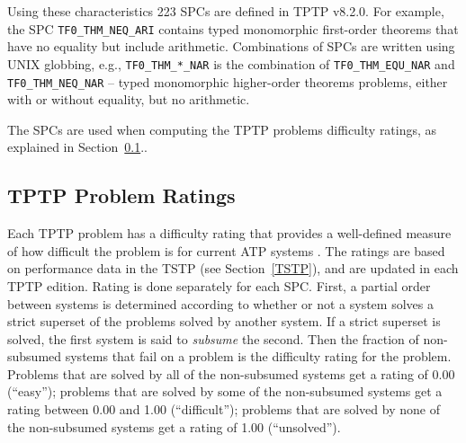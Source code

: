 \documentclass[runningheads]{llncs}
\begin{document}
Using these characteristics 223 SPCs are defined in TPTP v8.2.0. 
For example, the SPC
{\tt TF0\_THM\_NEQ\_ARI} contains typed monomorphic first-order theorems that have no equality but 
include arithmetic.
Combinations of SPCs are written using UNIX globbing, e.g., {\tt TF0\_THM\_*\_NAR} is the
combination of {\tt TF0\_THM\_EQU\_NAR} and {\tt TF0\_THM\_NEQ\_NAR} -- typed monomorphic 
higher-order theorems problems, either with or without equality, but no arithmetic.

The SPCs are used when computing the TPTP problems difficulty ratings, as explained in
Section~\ref{Ratings}..

\subsection{TPTP Problem Ratings}
\label{Ratings}

Each TPTP problem has a difficulty rating that provides a well-defined measure of how difficult 
the problem is for current ATP systems \cite{SS01}.
The ratings are based on performance data in the TSTP (see Section~\ref{TSTP}), and are updated
in each TPTP edition.
Rating is done separately for each SPC.
First, a partial order between systems is determined according to whether or not a system 
solves a strict superset of the problems solved by another system. 
If a strict superset is solved, the first system is said to {\em subsume} the second. 
Then the fraction of non-subsumed systems that fail on a problem is the difficulty rating 
for the problem. 
Problems that are solved by all of the non-subsumed systems get a rating of 0.00 (``easy'');
problems that are solved by some of the non-subsumed systems get a rating between 
0.00 and 1.00 (``difficult''); 
problems that are solved by none of the non-subsumed systems get a rating of 1.00 (``unsolved'').

\end{document}
